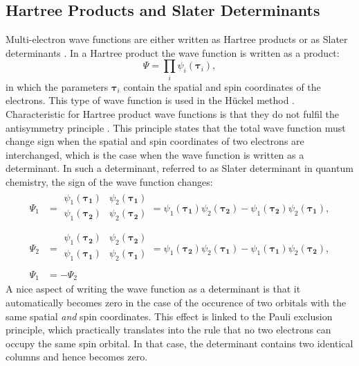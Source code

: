 \subsection{Hartree Products and Slater Determinants}

Multi-electron wave functions are either written as Hartree products \cite{hartree1,hartree2,hartree3} or as Slater determinants \cite{slater}. In a Hartree product the wave function is written as a product:
\begin{equation}
\Psi=\prod_i \psi_i(\mathbf{\tau}_i),
\end{equation}
in which the parameters $\mathbf{\tau}_i$ contain the spatial and spin coordinates of the electrons. This type of wave function is used in the H\"uckel method \cite{huckel1,huckel2,huckel3}. Characteristic for Hartree product wave functions is that they do not fulfil the antisymmetry principle \cite{atkins}. This principle states that the total wave function must change sign when the spatial and spin coordinates of two electrons are interchanged, which is the case when the wave function is written as a determinant. In such a determinant, referred to as Slater determinant in quantum chemistry, the sign of the wave function changes:
\begin{equation}
\begin{split}
\Psi_1 &=
\begin{array}{|cc|}
\psi_1(\mathbf{\tau_1}) & \psi_2(\mathbf{\tau_1}) \\
\psi_1(\mathbf{\tau_2}) & \psi_2(\mathbf{\tau_2}) \\
\end{array}
= \psi_1(\mathbf{\tau_1})\psi_2(\mathbf{\tau_2}) - \psi_1(\mathbf{\tau_2})\psi_2(\mathbf{\tau_1}), \\
\Psi_2 &=
\begin{array}{|cc|}
\psi_1(\mathbf{\tau_2}) & \psi_2(\mathbf{\tau_2}) \\
\psi_1(\mathbf{\tau_1}) & \psi_2(\mathbf{\tau_1}) \\
\end{array}
= \psi_1(\mathbf{\tau_2})\psi_2(\mathbf{\tau_1}) - \psi_1(\mathbf{\tau_1})\psi_2(\mathbf{\tau_2}), \\
\Psi_1 &= - \Psi_2
\end{split}
\label{ch1.eq.slater}
\end{equation}
A nice aspect of writing the wave function as a determinant is that it automatically becomes zero in the case of the occurence of two orbitals with the same spatial \textit{and} spin coordinates. This effect is linked to the Pauli exclusion principle, which practically translates into the rule that no two electrons can occupy the same spin orbital. In that case, the determinant contains two identical columns and hence becomes zero.

